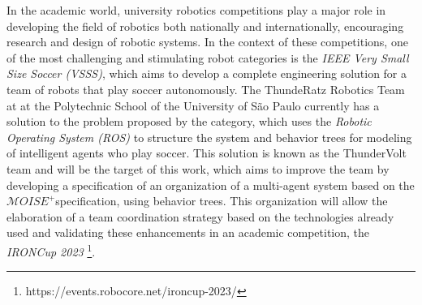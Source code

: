 \def \MOISEp {$\mathcal{M}OISE^+$} 

In the academic world, university robotics competitions play a major role in developing the field of robotics both nationally and internationally, encouraging research and design of robotic systems. In the context of these competitions, one of the most challenging and stimulating robot categories is the \textit{IEEE Very Small Size Soccer (VSSS)}, which aims to develop a complete engineering solution for a team of robots that play soccer autonomously. The ThundeRatz Robotics Team at at the Polytechnic School of the University of São Paulo currently has a solution to the problem proposed by the category, which uses the \textit{Robotic Operating System (ROS)} to structure the system and behavior trees for modeling of intelligent agents who play soccer. This solution is known as the ThunderVolt team and will be the target of this work, which aims to improve the team by developing a specification of an organization of a multi-agent system based on the \MOISEp specification, using behavior trees. This organization will allow the elaboration of a team coordination strategy based on the technologies already used and validating these enhancements in an academic competition, the \textit{IRONCup 2023} \footnote{https://events.robocore.net/ironcup-2023/}.
